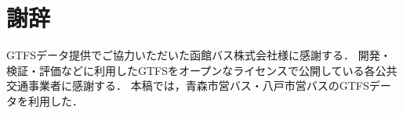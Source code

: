 \section*{謝辞}

GTFSデータ提供でご協力いただいた函館バス株式会社様に感謝する．
開発・検証・評価などに利用したGTFSをオープンなライセンスで公開している各公共交通事業者に感謝する．
本稿では，青森市営バス・八戸市営バスのGTFSデータを利用した．
